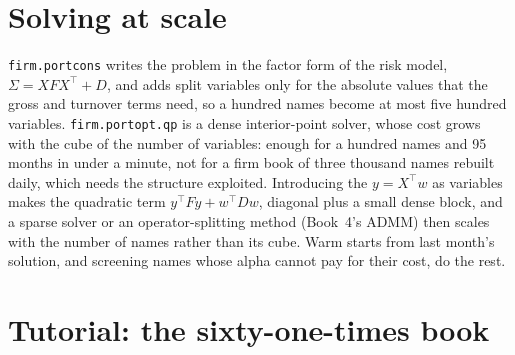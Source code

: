 \begin{omfigure}

\label{fig:rs:portfolio-construction-i:decomp}
\end{omfigure}

\section{Solving at scale}

\texttt{firm.portcons} writes the problem in the factor form of the risk model, $\Sigma = XFX^\top + D$, and adds split variables only for the absolute values
that the gross and turnover terms need, so a hundred names become at most five hundred variables. \texttt{firm.portopt.qp} is a dense interior-point solver, whose cost
grows with the cube of the number of variables: enough for a hundred names and 95 months in under a minute, not for a firm book of three thousand names rebuilt
daily, which needs the structure exploited. Introducing the 
$y = X^\top w$ as variables makes the quadratic term $y^\top F y + w^\top D w$, diagonal plus a small dense block, and a sparse solver or an operator-splitting
method (Book~4's ADMM) then scales with the number of names rather than its cube. Warm starts from last month's solution, and screening names whose alpha
cannot pay for their cost, do the rest.

\section{Tutorial: the sixty-one-times book}\label{tut:rs:portfolio-construction-i:tut}

